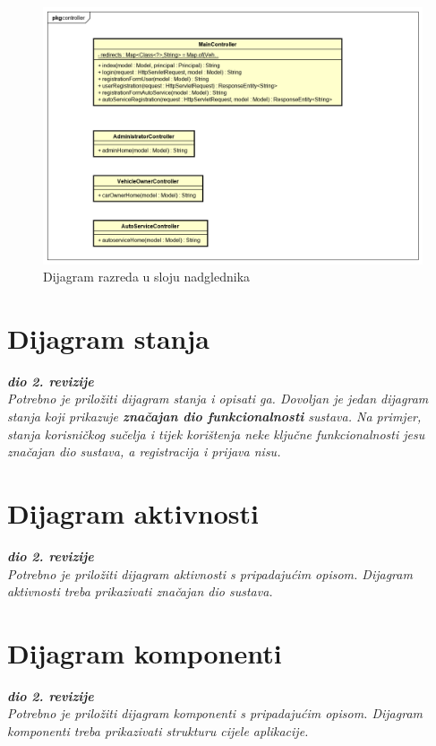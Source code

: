 		
		\begin{figure}
			\centering
			\includegraphics[width=1.0\linewidth]{dijagrami/class_diagram_ctrl}
			\caption{Dijagram razreda u sloju nadglednika}
			\label{fig:classdiagramctrl}
		\end{figure}
			
			
			\eject
		
		\section{Dijagram stanja}
			
			
			\textbf{\textit{dio 2. revizije}}\\
			
			\textit{Potrebno je priložiti dijagram stanja i opisati ga. Dovoljan je jedan dijagram stanja koji prikazuje \textbf{značajan dio funkcionalnosti} sustava. Na primjer, stanja korisničkog sučelja i tijek korištenja neke ključne funkcionalnosti jesu značajan dio sustava, a registracija i prijava nisu. }
			
			
			\eject 
		
		\section{Dijagram aktivnosti}
			
			\textbf{\textit{dio 2. revizije}}\\
			
			 \textit{Potrebno je priložiti dijagram aktivnosti s pripadajućim opisom. Dijagram aktivnosti treba prikazivati značajan dio sustava.}
			
			\eject
		\section{Dijagram komponenti}
		
			\textbf{\textit{dio 2. revizije}}\\
		
			 \textit{Potrebno je priložiti dijagram komponenti s pripadajućim opisom. Dijagram komponenti treba prikazivati strukturu cijele aplikacije.}